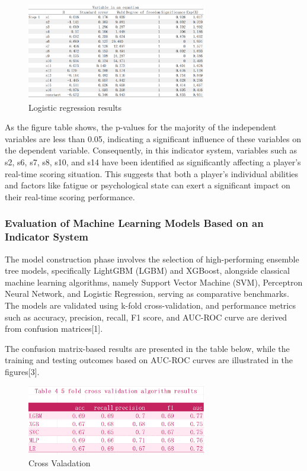 \documentclass[12pt]{article}
\begin{document}
\begin{figure}[H]
      \centering
      \includegraphics[width=0.7\textwidth]{variable_eq1.png}
      \caption{Logistic regression results}
\end{figure}
As the figure table shows, the p-values for the majority of the independent variables are less than 0.05, indicating a significant influence of these variables on the dependent variable. Consequently, in this indicator system,
variables such as s2, s6, s7, s8, s10, and s14 have been identified as significantly affecting a player's real-time scoring situation.
This suggests that both a player's individual abilities and factors like fatigue or psychological state can exert a significant impact on their real-time scoring performance.

\subsubsection{Evaluation of Machine Learning Models Based on an Indicator System}
The model construction phase involves the selection of high-performing ensemble tree models, specifically LightGBM (LGBM) and XGBoost, alongside classical machine learning algorithms,
namely Support Vector Machine (SVM), Perceptron Neural Network, and Logistic Regression, serving as comparative benchmarks. The models are validated using k-fold cross-validation,
and performance metrics such as accuracy, precision, recall, F1 score, and AUC-ROC curve are derived from confusion matrices[1].

The confusion matrix-based results are presented in the table below, while the training and testing outcomes based on AUC-ROC curves are illustrated in the figures[3].
\begin{figure}[H]
      \centering
      \includegraphics[width=0.7\textwidth]{crossValidation.png}
      \caption{Cross Valadation}
\end{figure}
\end{document}
